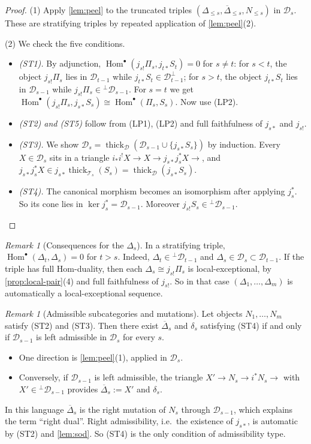 \documentclass[11pt,reqno]{amsart}
\theoremstyle{plain}
\theoremstyle{definition}
\theoremstyle{remark}
\newtheorem{remark}[theorem]{Remark}
\DeclareMathOperator{\Hom}{Hom}
\newcommand{\thick}[2][\cD]{\operatorname{thick}_{#1}(#2)}
\newcommand{\Deltabar}{\overline{\Delta}}
\newcommand{\cD}{\mathcal{D}}
\newcommand{\cT}{\mathcal{T}}
\begin{document}
\begin{proof}
(1) Apply \cref{lem:peel} to the truncated triples $(\Delta_{\le s},\Deltabar_{\le s},N_{\le s})$ in $\cD_s$. These are stratifying triples by repeated application of \cref{lem:peel}(2).

(2) We check the five conditions.
\begin{itemize}
\item \emph{(ST1).} By adjunction, $\Hom^\bullet(j_{s!}\Pi_s,j_{t*}S_t)=0$ for $s\ne t$: for $s<t$, the object $j_{s!}\Pi_s$ lies in $\cD_{t-1}$ while $j_{t*}S_t\in\cD_{t-1}^\perp$; for $s>t$, the object $j_{t*}S_t$ lies in $\cD_{s-1}$ while $j_{s!}\Pi_s\in{}^\perp\cD_{s-1}$. For $s=t$ we get $\Hom^\bullet(j_{s!}\Pi_s,j_{s*}S_s)\cong\Hom^\bullet(\Pi_s,S_s)$. Now use (LP2).
\item \emph{(ST2) and (ST5)} follow from (LP1), (LP2) and full faithfulness of $j_{s*}$ and $j_{s!}$.
\item \emph{(ST3).} We show $\cD_s=\thick{\cD_{s-1}\cup\{j_{s*}S_s\}}$ by induction. Every $X\in\cD_s$ sits in a triangle $i_*i^!X\to X\to j_{s*}j_s^*X\to$, and $j_{s*}j_s^*X\in j_{s*}\thick[\cT_s]{S_s}=\thick{j_{s*}S_s}$.
\item \emph{(ST4).} The canonical morphism becomes an isomorphism after applying $j_s^*$. So its cone lies in $\ker j_s^*=\cD_{s-1}$. Moreover $j_{s!}S_s\in{}^\perp\cD_{s-1}$. \qedhere
\end{itemize}
\end{proof}

\begin{remark}[Consequences for the $\Delta_s$]\label{rem:Delta-semiorth}
In a stratifying triple, $\Hom^\bullet(\Delta_t,\Delta_s)=0$ for $t>s$. Indeed, $\Delta_t\in{}^\perp\cD_{t-1}$ and $\Delta_s\in\cD_s\subset\cD_{t-1}$. If the triple has full Hom-duality, then each $\Delta_s\cong j_{s!}\Pi_s$ is local-exceptional, by \cref{prop:local-pair}(4) and full faithfulness of $j_{s!}$. So in that case $(\Delta_1,\dots,\Delta_m)$ is automatically a local-exceptional sequence.
\end{remark}

\begin{remark}[Admissible subcategories and mutations]\label{rem:HD4}
Let objects $N_1,\dots,N_m$ satisfy (ST2) and (ST3). Then there exist $\Deltabar_s$ and $\delta_s$ satisfying (ST4) if and only if $\cD_{s-1}$ is left admissible in $\cD_s$ for every $s$.
\begin{itemize}
\item One direction is \cref{lem:peel}(1), applied in $\cD_s$.
\item Conversely, if $\cD_{s-1}$ is left admissible, the triangle $X'\to N_s\to i^*N_s\to$ with $X'\in{}^\perp\cD_{s-1}$ provides $\Deltabar_s:=X'$ and $\delta_s$.
\end{itemize}
In this language $\Deltabar_s$ is the right mutation of $N_s$ through $\cD_{s-1}$, which explains the term ``right dual''. Right admissibility, i.e.\ the existence of $j_{s*}$, is automatic by (ST2) and \cref{lem:sod}. So (ST4) is the only condition of admissibility type.
\end{remark}
\end{document}
